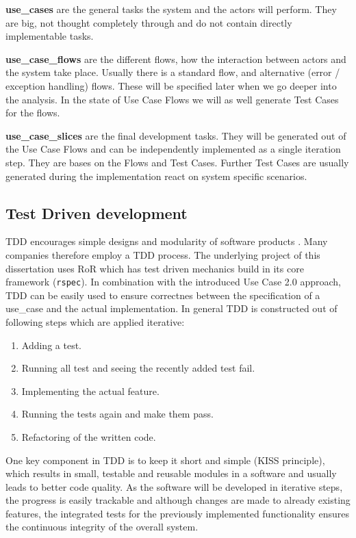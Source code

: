 \textbf{\glspl{use_case}} are the general tasks the system and the actors will perform. They are big, not thought completely through and do not contain directly implementable tasks.

\textbf{\glspl{use_case_flow}} are the different flows, how the interaction between actors and the system take place. Usually there is a standard flow, and alternative (error / exception handling) flows. These will be specified later when we go deeper into the analysis. In the state of Use Case Flows we will as well generate Test Cases for the flows. 

\textbf{\glspl{use_case_slice}} are the final development tasks. They will be generated out of the Use Case Flows and can be independently implemented as a single iteration step. They are bases on the Flows and Test Cases. Further Test Cases are usually generated during the implementation react on system specific scenarios.


\subsection{Test Driven development}
\label{sec:tdd}
\Gls{TDD} encourages simple designs and modularity of software products \cite{tdd}. Many companies therefore employ a \gls{TDD} process. The underlying project of this dissertation uses \gls{RoR} which has test driven mechanics build in its core framework (\texttt{rspec}). In combination with the introduced Use Case 2.0 approach, \gls{TDD} can be easily used to ensure correctnes between the specification of a \gls{use_case} and the actual implementation. In general \gls{TDD} is constructed out of following steps which are applied iterative: 

\bigskip

\begin{enumerate}
	\item Adding a test.
	\item Running all test and seeing the recently added test fail.
	\item Implementing the actual feature.
	\item Running the tests again and make them pass.
	\item Refactoring of the written code.
\end{enumerate}

\bigskip

One key component in \gls{TDD} is to keep it short and simple (KISS principle), which results in small, testable and reusable modules in a software and usually leads to better code quality. As the software will be developed in iterative steps, the progress is easily trackable and although changes are made to already existing features, the integrated tests for the previously implemented functionality ensures the continuous integrity of the overall system.  

